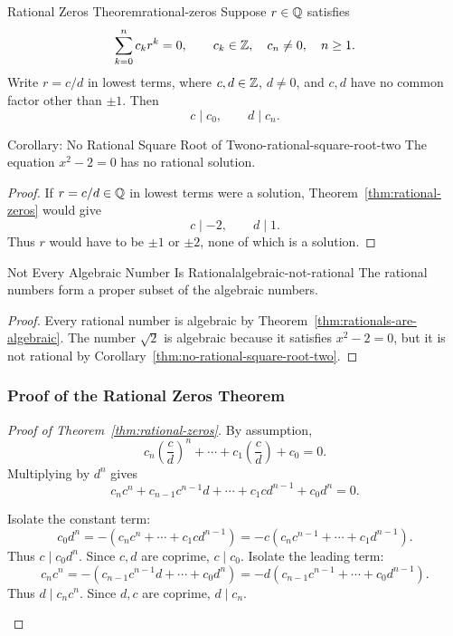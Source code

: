 \begin{theorem}{Rational Zeros Theorem}{rational-zeros}
  Suppose $r\in\mathbb{Q}$ satisfies
  \[
    \sum_{k=0}^{n}c_k r^k=0,
    \qquad c_k\in\mathbb{Z},\quad c_n\ne0,\quad n\ge1.
  \]
  Write $r=c/d$ in lowest terms, where $c,d\in\mathbb{Z}$, $d\ne0$, and $c,d$ have no common factor other than $\pm1$.
  Then
  \[
    c\mid c_0,\qquad d\mid c_n.
  \]
\end{theorem}

\begin{theorem}{Corollary: No Rational Square Root of Two}{no-rational-square-root-two}
  The equation $x^2-2=0$ has no rational solution.
\end{theorem}

\begin{proof}
  If $r=c/d\in\mathbb{Q}$ in lowest terms were a solution, Theorem~\ref{thm:rational-zeros} would give
  \[
    c\mid -2,\qquad d\mid 1.
  \]
  Thus $r$ would have to be $\pm1$ or $\pm2$, none of which is a solution.
\end{proof}

\begin{theorem}{Not Every Algebraic Number Is Rational}{algebraic-not-rational}
  The rational numbers form a proper subset of the algebraic numbers.
\end{theorem}

\begin{proof}
  Every rational number is algebraic by Theorem~\ref{thm:rationals-are-algebraic}.
  The number $\sqrt{2}$ is algebraic because it satisfies $x^2-2=0$, but it is not rational by Corollary~\ref{thm:no-rational-square-root-two}.
\end{proof}

\subsubsection{Proof of the Rational Zeros Theorem}

\begin{proof}[Proof of Theorem~\ref{thm:rational-zeros}]
  By assumption,
  \[
    c_n\left(\frac{c}{d}\right)^n+\cdots+c_1\left(\frac{c}{d}\right)+c_0=0.
  \]
  Multiplying by $d^n$ gives
  \[
    c_nc^n+c_{n-1}c^{n-1}d+\cdots+c_1cd^{n-1}+c_0d^n=0.
  \]
  \begin{enumerate}[proofsubgoals]
    Isolate the constant term:
    \[
      c_0d^n=-(c_nc^n+\cdots+c_1cd^{n-1})
      =-c(c_nc^{n-1}+\cdots+c_1d^{n-1}).
    \]
    Thus $c\mid c_0d^n$. Since $c,d$ are coprime, $c\mid c_0$.
    Isolate the leading term:
    \[
      c_nc^n=-(c_{n-1}c^{n-1}d+\cdots+c_0d^n)
      =-d(c_{n-1}c^{n-1}+\cdots+c_0d^{n-1}).
    \]
    Thus $d\mid c_nc^n$. Since $d,c$ are coprime, $d\mid c_n$.\qedhere
  \end{enumerate}
\end{proof}
